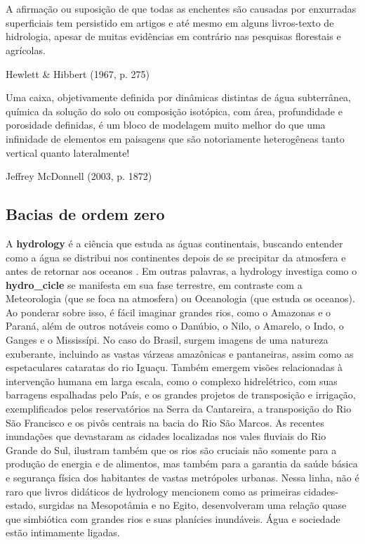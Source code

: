 \documentclass[./main.tex]{subfiles}
\begin{document}
\chapter{\chapHydro} \label{chap:hydrology}

\setlength{\parskip}{0mm}

\epigraph{\small{A afirmação ou suposição de que todas as enchentes são causadas por enxurradas superficiais tem persistido em artigos e até mesmo em alguns livros-texto de hidrologia, apesar de muitas evidências em contrário nas pesquisas florestais e agrícolas.}}{Hewlett \& Hibbert (1967, p. 275) \cite{Hewlett1967}}

\epigraph{\small{Uma caixa, objetivamente definida por dinâmicas distintas de água subterrânea, química da solução do solo ou composição isotópica, com área, profundidade e porosidade definidas, é um bloco de modelagem muito melhor do que uma infinidade de elementos em paisagens que são notoriamente heterogêneas tanto vertical quanto lateralmente!}}{Jeffrey McDonnell (2003, p. 1872) \cite{Mcdonnell2003a}}


\setlength{\parskip}{\myparskip}

\section{Bacias de ordem zero} \label{sec:hydro:intro}

\par A \textbf{\gls{hydrology}} é a ciência que estuda as águas continentais, buscando entender como a água se distribui nos continentes depois de se precipitar da atmosfera e antes de retornar aos oceanos \cite{chow1964}. Em outras palavras, a \gls{hydrology} investiga como o \textbf{\gls{hydro_cicle}} se manifesta em sua fase terrestre, em contraste com a Meteorologia (que se foca na atmosfera) ou Oceanologia (que estuda os oceanos). Ao ponderar sobre isso, é fácil imaginar grandes rios, como o Amazonas e o Paraná, além de outros notáveis como o Danúbio, o Nilo, o Amarelo, o Indo, o Ganges e o Mississípi. No caso do Brasil, surgem imagens de uma natureza exuberante, incluindo as vastas várzeas amazônicas e pantaneiras, assim como as espetaculares cataratas do rio Iguaçu. Também emergem visões relacionadas à intervenção humana em larga escala, como o complexo hidrelétrico, com suas barragens espalhadas pelo País, e os grandes projetos de transposição e irrigação, exemplificados pelos reservatórios na Serra da Cantareira, a transposição do Rio São Francisco e os pivôs centrais na bacia do Rio São Marcos. As recentes inundações que devastaram as cidades localizadas nos vales fluviais do Rio Grande do Sul, ilustram também que os rios são cruciais não somente para a produção de energia e de alimentos, mas também para a garantia da saúde básica e segurança física dos habitantes de vastas metrópoles urbanas. Nessa linha, não é raro que livros didáticos de \gls{hydrology} mencionem como as primeiras cidades-estado, surgidas na Mesopotâmia e no Egito, desenvolveram uma relação quase que simbiótica com grandes rios e suas planícies inundáveis. Água e sociedade estão intimamente ligadas. 
\end{document}
